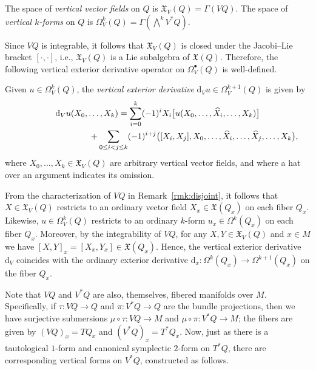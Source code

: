 \documentclass[pdftex]{sigma}
\numberwithin{equation}{section}
\begin{document}
\begin{Definition} The space of \emph{vertical vector fields} on $Q$ is $ \mathfrak{X} _V (Q) = \Gamma ( V Q ) $. The space of \emph{vertical $k$-forms} on $Q$ is $ \Omega _V ^k ( Q ) = \Gamma ( \bigwedge ^k V ^\ast Q ) $.
\end{Definition}

Since $ V Q $ is integrable, it follows that $ \mathfrak{X} _V ( Q ) $ is closed under the Jacobi--Lie bracket $ [ \cdot , \cdot ] $, i.e., $\mathfrak{X} _V (Q) $ is a Lie subalgebra of $ \mathfrak{X} (Q) $. Therefore, the following vertical exterior derivative operator on $ \Omega _V ^\bullet (Q) $ is well-def\/ined.

\begin{Definition} Given $ u \in \Omega ^k _V (Q) $, the \emph{vertical exterior derivative} $ \mathrm{d} _V u \in \Omega ^{ k + 1 } _V (Q) $
 is given by
\begin{gather*}
\mathrm{d} _V u ( X _0 , \ldots, X _k ) = \sum _{ i = 0 } ^k ( - 1 ) ^i X _i \bigl[ u ( X _0 , \ldots, \widehat{ X } _i , \ldots, X _k ) \bigr] \\
\hphantom{\mathrm{d} _V u ( X _0 , \ldots, X _k ) =}{} + \sum _{ 0 \leq i < j \leq k } ( - 1 ) ^{ i + j } \big( [X _i , X _j ], X _0 , \ldots, \widehat{ X } _i , \ldots, \widehat{ X } _j , \ldots, X _k \big) ,
 \end{gather*}
where $ X _0 , \ldots, X _k \in \mathfrak{X} _V (Q) $ are arbitrary vertical vector f\/ields, and where a hat over an argument indicates its omission.
\end{Definition}

\begin{Remark} From the characterization of $ V Q $ in Remark~\ref{rmk:disjoint}, it follows that $ X \in \mathfrak{X} _V (Q) $ restricts to an ordinary vector f\/ield $ X _x \in \mathfrak{X} ( Q _x ) $ on each f\/iber $Q _x$. Likewise, $ u \in \Omega ^k _V ( Q ) $ restricts to an ordinary $k$-form $ u _x \in \Omega ^k ( Q _x ) $ on each f\/iber $ Q _x $. Moreover, by the integrability of $V Q$, for any $ X, Y \in \mathfrak{X} _V (Q) $ and $ x \in M $ we have $ [ X, Y ] _x = [ X _x , Y _x ] \in \mathfrak{X} ( Q _x ) $. Hence, the vertical exterior derivative $ \mathrm{d} _V $ coincides with the ordinary exterior derivative $ \mathrm{d} _x \colon \Omega ^k ( Q _x ) \rightarrow \Omega ^{ k + 1 } ( Q _x ) $ on the f\/iber $ Q _x $.
\end{Remark}

Note that $ V Q $ and $ V ^\ast Q $ are also, themselves, f\/ibered manifolds over $M$. Specif\/ically, if $ \tau \colon V Q \rightarrow Q $ and $ \pi \colon V ^\ast Q \rightarrow Q $ are the bundle projections, then we have surjective submersions $ \mu \circ \tau \colon V Q \rightarrow M $ and
$ \mu \circ \pi \colon V ^\ast Q \rightarrow M $; the f\/ibers are given by $ (V Q) _x = T Q _x $ and $ (V ^\ast Q) _x = T ^\ast Q _x $. Now,
just as there is a tautological $1$-form and canonical symplectic $2$-form on $ T ^\ast Q $, there are corresponding vertical forms on $ V ^\ast Q $, constructed as follows.
\end{document}
